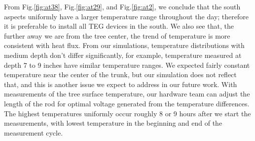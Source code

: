 \documentclass{IEEEtran} %
\begin{document}
\begin{comment}
  \begin{figure}
  \texttt{[image: fig/temp29.png]}
  \caption{For a tree with 12 inch radius, temperature distribution in the north and south aspects, with depth of about 7 inches.} 
  \label{fig:at29}
\end{figure}
\end{comment}



\begin{comment}\begin{figure}
  \texttt{[image: fig/temp2.png]}
  \caption{For a tree with 12 inch radius, temperature distribution in the north and south aspects, near tree center.} 
  \label{fig:at2}
\end{figure}
\end{comment}

From Fig.\ref{fig:at38}, Fig.\ref{fig:at29}, and Fig.\ref{fig:at2}, we conclude that the south aspects uniformly have a larger temperature range throughout the day; therefore it is preferable to install all TEG devices in the south. We also see that, the further away we are from the tree center, the trend of temperature is more consistent with heat flux. From our simulations, temperature distributions with medium depth don't differ significantly, for example, temperature measured at depth 7 to 9 inches have similar temperature ranges. We expected fairly constant temperature near the center of the trunk, but our simulation does not reflect that, and this is another issue we expect to address in our future work.
With measurements of the tree surface temperature, our hardware team can adjust the length of the rod for optimal voltage generated from the temperature differences. The highest temperatures uniformly occur roughly 8 or 9 hours after we start the measurements, with lowest temperature in the beginning and end of the measurement cycle. 
\end{document}
